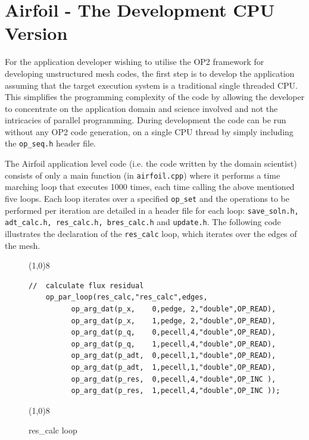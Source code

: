 \documentclass[11pt]{article}
\begin{document}
\section{Airfoil - The Development CPU Version}

For the application developer wishing to utilise the OP2 framework for developing unstructured mesh codes, the first
step is to develop the application assuming that the target execution system is a traditional single threaded CPU.
This simplifies the programming complexity of the code by allowing the developer to concentrate on the application
domain and science involved and not the intricacies of parallel programming. During development the code can be run
without any OP2 code generation, on a single CPU thread by simply including the \texttt{op\_seq.h} header file. 

The Airfoil application level code (i.e. the code written by the domain scientist) consists of only a main function (in
\texttt{airfoil.cpp}) where it performs a time marching loop that executes 1000 times, each time calling the above
mentioned five loops. Each loop iterates over a specified \texttt{op\_set} and the operations to be performed per
iteration are detailed in a header file for each loop: \texttt{save\_soln.h, adt\_calc.h, res\_calc.h, bres\_calc.h} and
\texttt{update.h}. The following code illustrates the declaration of the \texttt{res\_calc} loop, which iterates over
the edges of the mesh.


\begin{figure}\small
\vspace{-0pt}\noindent\line(1,0){8}\vspace{-10pt}
\begin{lstlisting}
//  calculate flux residual
    op_par_loop(res_calc,"res_calc",edges,
          op_arg_dat(p_x,    0,pedge, 2,"double",OP_READ),
          op_arg_dat(p_x,    1,pedge, 2,"double",OP_READ),
          op_arg_dat(p_q,    0,pecell,4,"double",OP_READ),
          op_arg_dat(p_q,    1,pecell,4,"double",OP_READ),
          op_arg_dat(p_adt,  0,pecell,1,"double",OP_READ),
          op_arg_dat(p_adt,  1,pecell,1,"double",OP_READ),
          op_arg_dat(p_res,  0,pecell,4,"double",OP_INC ),
          op_arg_dat(p_res,  1,pecell,4,"double",OP_INC ));
\end{lstlisting}\vspace{-10pt}
\vspace{-0pt}\noindent\line(1,0){8}\vspace{-10pt}
\caption{\small res\_calc loop}
\normalsize\vspace{-10pt}\label{fig:rescalc}
\end{figure}
\end{document}
